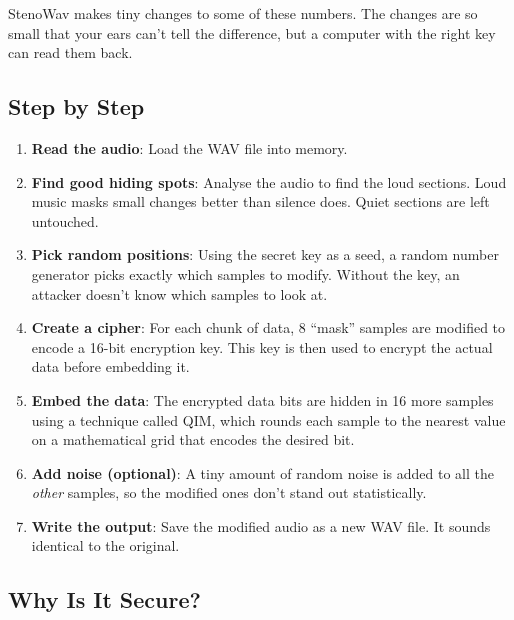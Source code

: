 \documentclass[11pt,a4paper]{article}
\begin{document}
StenoWav makes tiny changes to some of these numbers.  The changes are so
small that your ears can't tell the difference, but a computer with the
right key can read them back.

\subsection{Step by Step}

\begin{enumerate}
    \item \textbf{Read the audio}: Load the WAV file into memory.

    \item \textbf{Find good hiding spots}: Analyse the audio to find
          the loud sections.  Loud music masks small changes better than
          silence does.  Quiet sections are left untouched.

    \item \textbf{Pick random positions}: Using the secret key as a seed,
          a random number generator picks exactly which samples to modify.
          Without the key, an attacker doesn't know which samples to look at.

    \item \textbf{Create a cipher}: For each chunk of data, 8 ``mask''
          samples are modified to encode a 16-bit encryption key.  This
          key is then used to encrypt the actual data before embedding it.

    \item \textbf{Embed the data}: The encrypted data bits are hidden in
          16 more samples using a technique called QIM, which rounds each
          sample to the nearest value on a mathematical grid that encodes
          the desired bit.

    \item \textbf{Add noise (optional)}: A tiny amount of random noise is
          added to all the \emph{other} samples, so the modified ones
          don't stand out statistically.

    \item \textbf{Write the output}: Save the modified audio as a new WAV
          file.  It sounds identical to the original.
\end{enumerate}

\subsection{Why Is It Secure?}
\end{document}
